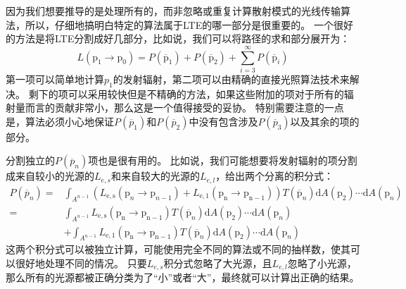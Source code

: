 \documentclass[a4paper]{article}
\begin{document}
	因为我们想要推导的是处理所有的，而非忽略或重复计算散射模式的光线传输算法，所以，仔细地搞明白特定的算法属于LTE的哪一部分是很重要的。
	一个很好的方法是将LTE分割成好几部分，比如说，我们可以将路径的求和部分展开为：
	\begin{equation*}
		L\left(\mathrm{p}_{1} \rightarrow \mathrm{p}_{0}\right)=P\left(\overline{\mathrm{p}}_{1}\right)+P\left(\overline{\mathrm{p}}_{2}\right)+\sum_{i=3}^{\infty} P\left(\overline{\mathrm{p}}_{i}\right)
	\end{equation*}
	第一项可以简单地计算$p_1$的发射辐射，第二项可以由精确的直接光照算法技术来解决。
	剩下的项可以采用较快但是不精确的方法，如果这些附加的项对于所有的辐射量而言的贡献非常小，那么这是一个值得接受的妥协。
	特别需要注意的一点是，算法必须小心地保证$P(\overline{p}_1)$和$P(\overline{p}_2)$中没有包含涉及$P(\overline{p}_3)$以及其余的项的部分。

	分割独立的$P(\overline{p}_n)$项也是很有用的。
	比如说，我们可能想要将发射辐射的项分割成来自较小的光源的$L_{e,s}$和来自较大的光源的$L_{e,l}$，给出两个分离的积分式：
	\begin{equation*}
		\begin{aligned}
			P\left(\overline{p}_{n}\right)=& \int_{A^{n-1}}\left(L_{\mathrm{e}, \mathrm{s}}\left(\mathrm{p}_{n} \rightarrow \mathrm{p}_{n-1}\right)+L_{\mathrm{e}, 1}\left(\mathrm{p}_{\mathrm{n}} \rightarrow \mathrm{p}_{\mathrm{n}-1}\right)\right) T\left(\overline{\mathrm{p}}_{n}\right) \mathrm{d} A\left(\mathrm{p}_{2}\right) \cdots \mathrm{d} A\left(\mathrm{p}_{n}\right) \\
			=& \int_{A^{n-1}} L_{\mathrm{e}, \mathrm{s}}\left(\mathrm{p}_{\mathrm{n}} \rightarrow \mathrm{p}_{\mathrm{n}-1}\right) T\left(\overline{\mathrm{p}}_{n}\right) \mathrm{d} A\left(\mathrm{p}_{2}\right) \cdots \mathrm{d} A\left(\mathrm{p}_{n}\right) \\
			&+\int_{A^{n-1}} L_{\mathrm{e}, 1}\left(\mathrm{p}_{\mathrm{n}} \rightarrow \mathrm{p}_{\mathrm{n}-1}\right) T\left(\overline{\mathrm{p}}_{n}\right) \mathrm{d} A\left(\mathrm{p}_{2}\right) \cdots \mathrm{d} A\left(\mathrm{p}_{n}\right)
		\end{aligned}
	\end{equation*}
	这两个积分式可以被独立计算，可能使用完全不同的算法或不同的抽样数，使其可以很好地处理不同的情况。
	只要$L_{e,s}$积分式忽略了大光源，且$L_{e,l}$忽略了小光源，那么所有的光源都被正确分类为了“小”或者“大”，最终就可以计算出正确的结果。
\end{document}
